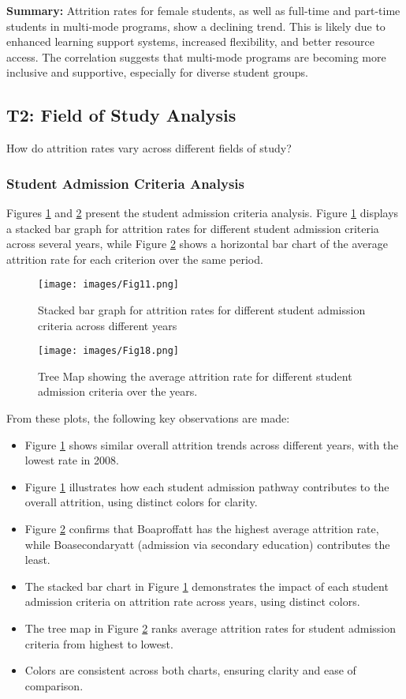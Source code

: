 \documentclass[conference]{IEEEtran}
\begin{document}
\textbf{Summary:} Attrition rates for female students, as well as full-time and part-time students in multi-mode programs, show a declining trend. This is likely due to enhanced learning support systems, increased flexibility, and better resource access. The correlation suggests that multi-mode programs are becoming more inclusive and supportive, especially for diverse student groups.
\subsection{T2: Field of Study Analysis}
How do attrition rates vary across different fields of study?

\subsubsection{Student Admission Criteria Analysis}
Figures \ref{fig:stackbar1} and \ref{fig:treemap2} present the student admission criteria analysis. Figure \ref{fig:stackbar1} displays a stacked bar graph for attrition rates for different student admission criteria across several years, while Figure \ref{fig:treemap2} shows a horizontal bar chart of the average attrition rate for each criterion over the same period.

\begin{figure}[H]
    \centering
    \texttt{[image: images/Fig11.png]}
    \caption{Stacked bar graph for attrition rates for different student admission criteria across different years}
    \label{fig:stackbar1}
\end{figure}

\begin{figure}[H]
    \centering
    \texttt{[image: images/Fig18.png]}
    \caption{Tree Map showing the average attrition rate for different student admission criteria over the years.}
    \label{fig:treemap2}
\end{figure}

From these plots, the following key observations are made:
\begin{itemize} 
    \item Figure \ref{fig:stackbar1} shows similar overall attrition trends across different years, with the lowest rate in 2008.
    \item Figure \ref{fig:stackbar1} illustrates how each student admission pathway contributes to the overall attrition, using distinct colors for clarity.
    \item Figure \ref{fig:treemap2} confirms that Boaproffatt has the highest average attrition rate, while Boasecondaryatt (admission via secondary education) contributes the least.
    \item The stacked bar chart in Figure \ref{fig:stackbar1} demonstrates the impact of each student admission criteria on attrition rate across years, using distinct colors.
    \item The tree map in Figure \ref{fig:treemap2} ranks average attrition rates for student admission criteria
from highest to lowest.
    \item Colors are consistent across both charts, ensuring clarity and ease of comparison.
\end{itemize}
\end{document}
